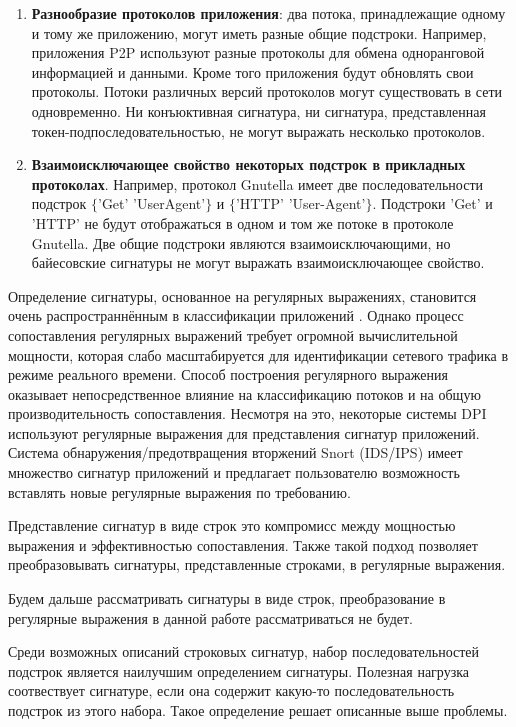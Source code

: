 \begin{enumerate}
    \item \textbf{Разнообразие протоколов приложения}: два потока, принадлежащие одному и тому же приложению, могут иметь разные общие подстроки.
    Например, приложения P2P используют разные протоколы для обмена одноранговой информацией и данными. Кроме того приложения будут обновлять свои протоколы.
    Потоки различных версий протоколов могут существовать в сети одновременно.
    Ни конъюктивная сигнатура, ни сигнатура, представленная токен-подпоследовательностью, не могут выражать несколько протоколов.
    \item \textbf{Взаимоисключающее свойство некоторых подстрок в прикладных протоколах}.
    Например, протокол Gnutella имеет две последовательности подстрок $\{$'Get' 'UserAgent'$\}$ и $\{$'HTTP' 'User-Agent'$\}$.
    Подстроки 'Get' и 'HTTP' не будут отображаться в одном и том же потоке в протоколе Gnutella.
    Две общие подстроки являются взаимоисключающими, но байесовские сигнатуры не могут выражать взаимоисключающее свойство.
\end{enumerate}

Определение сигнатуры, основанное на регулярных выражениях, становится очень распространнённым в классификации приложений \cite{szabo2012automatic, wang2012generating, vinothgeorge2013efficient}.
Однако процесс сопоставления регулярных выражений требует огромной вычислительной мощности,
которая слабо масштабируется для идентификации сетевого трафика в режиме реального времени.
Способ построения регулярного выражения оказывает непосредственное влияние на классификацию потоков и на общую производительность сопоставления.
Несмотря на это, некоторые системы DPI используют регулярные выражения для представления сигнатур приложений.
Система обнаружения/предотвращения вторжений Snort (IDS/IPS) \cite{Snort}
имеет множество сигнатур приложений и предлагает пользователю возможность вставлять новые регулярные выражения по требованию.

Представление сигнатур в виде строк это компромисс между мощностью выражения и эффективностью сопоставления.
Также такой подход позволяет преобразовывать сигнатуры, представленные строками, в регулярные выражения.

Будем дальше рассматривать сигнатуры в виде строк, преобразование в регулярные выражения в данной работе рассматриваться не будет.

Среди возможных описаний строковых сигнатур, набор последовательностей подстрок является наилучшим определением сигнатуры.
Полезная нагрузка соотвествует сигнатуре, если она содержит какую-то последовательность подстрок из этого набора. Такое определение решает описанные выше проблемы.

